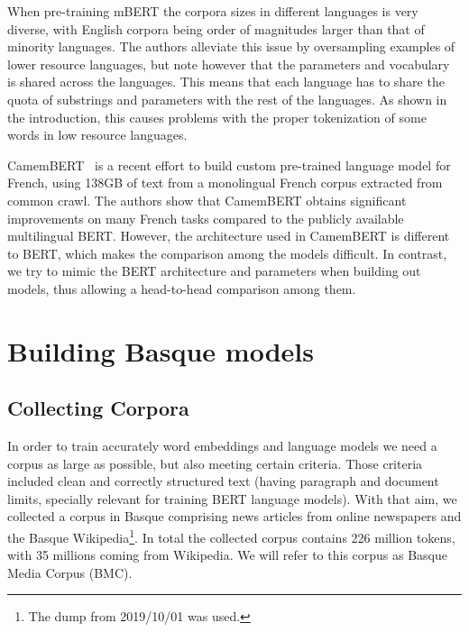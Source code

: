 \documentclass[10pt, a4paper]{article}
\begin{document}
When pre-training mBERT the corpora sizes in different languages is very diverse, with English corpora being order of magnitudes larger than that of minority languages. The authors alleviate this issue by oversampling examples of lower resource languages, but note however that the parameters and vocabulary is shared across the languages. This means that each language has to share the quota of substrings and parameters with the rest of the languages. As shown in the introduction, this causes problems with the proper tokenization of some words in low resource languages. 

CamemBERT~\cite{martin2019camembert} is a recent effort to build custom pre-trained language model for French, using 138GB of text from a monolingual French corpus extracted from common crawl. The authors show that CamemBERT obtains significant improvements on many French tasks compared to the publicly available multilingual BERT. However, the architecture used in CamemBERT is different to BERT, which makes the comparison among the models difficult. In contrast, we try to mimic the BERT architecture and parameters when building out models, thus allowing a head-to-head comparison among them. 

\section{Building Basque models}\label{sec:build-basq-models}

\subsection{Collecting Corpora}\label{sec:build-basq-models:corpora}

In order to train accurately word embeddings and language models we need a corpus as large as possible, but also meeting certain criteria. Those criteria included clean and correctly structured text (having paragraph and document limits, specially relevant for training BERT language models). With that aim, we collected a corpus in Basque comprising news articles from online newspapers and the Basque Wikipedia\footnote{The dump from 2019/10/01 was used.}. In total the collected corpus contains 226 million tokens, with 35 millions coming from Wikipedia. We will refer to this corpus as Basque Media Corpus (BMC).


\end{document}
